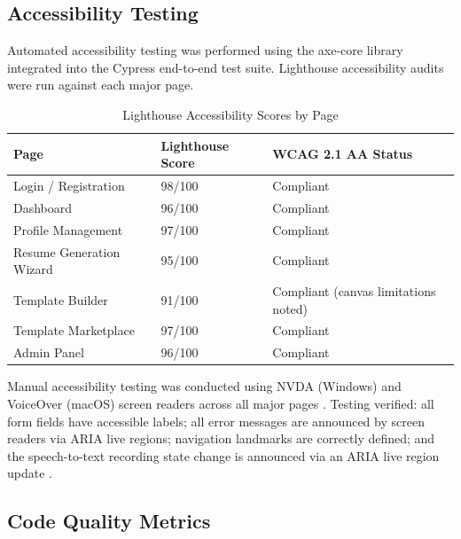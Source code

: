\documentclass[12pt, a4paper, oneside]{report}
\begin{document}
\subsection{Accessibility Testing}

Automated accessibility testing was performed using the axe-core library integrated into the Cypress \cite{cypress2024} end-to-end test suite. Lighthouse accessibility audits were run against each major page.

\begin{table}[H]
\centering
\caption{Lighthouse Accessibility Scores by Page}
\label{tab:accessibility_scores}
\renewcommand{\arraystretch}{1.4}
\begin{tabularx}{\textwidth}{|X|p{3cm}|p{3.5cm}|}
\hline
\textbf{Page} & \textbf{Lighthouse Score} & \textbf{WCAG 2.1 AA Status \cite{wcag21}} \\
\hline
Login / Registration & 98/100 & Compliant \\
\hline
Dashboard & 96/100 & Compliant \\
\hline
Profile Management & 97/100 & Compliant \\
\hline
Resume Generation Wizard & 95/100 & Compliant \\
\hline
Template Builder & 91/100 & Compliant (canvas limitations noted) \\
\hline
Template Marketplace & 97/100 & Compliant \\
\hline
Admin Panel & 96/100 & Compliant \\
\hline
\end{tabularx}
\end{table}

Manual accessibility testing was conducted using NVDA (Windows) and VoiceOver (macOS) screen readers across all major pages \cite{waiaria2023}. Testing verified: all form fields have accessible labels; all error messages are announced by screen readers via ARIA live regions; navigation landmarks are correctly defined; and the speech-to-text recording state change is announced via an ARIA live region update \cite{sears2003}.

\subsection{Code Quality Metrics}
\end{document}
